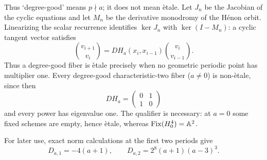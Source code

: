 Thus `degree-good' means $p\nmid a$; it does not mean \`etale.  Let $J_n$ be
the Jacobian of the cyclic equations and let $M_n$ be the derivative monodromy
of the H\'enon orbit.  Linearizing the scalar recurrence identifies
$\ker J_n$ with $\ker(I-M_n)$: a cyclic tangent vector satisfies
\[
 \binom{v_{i+1}}{v_i}
 =DH_a(x_i,x_{i-1})\binom{v_i}{v_{i-1}}.
\]
Thus a degree-good fiber is \`etale precisely when no geometric periodic
point has multiplier one.  Every degree-good characteristic-two fiber
($a\ne0$) is non-\`etale, since then
\[
 DH_a=\begin{pmatrix}0&1\\1&0\end{pmatrix}
\]
and every power has eigenvalue one.  The qualifier is necessary: at $a=0$
some fixed schemes are empty, hence \`etale, whereas $\operatorname{Fix}(H_0^4)=\mathbb A^2$.

For later use, exact norm calculations at the first two periods give
\begin{equation}\label{eq:discriminants}
 D_{a,1}=-4(a+1),\qquad
 D_{a,2}=2^8(a+1)(a-3)^3.
\end{equation}
